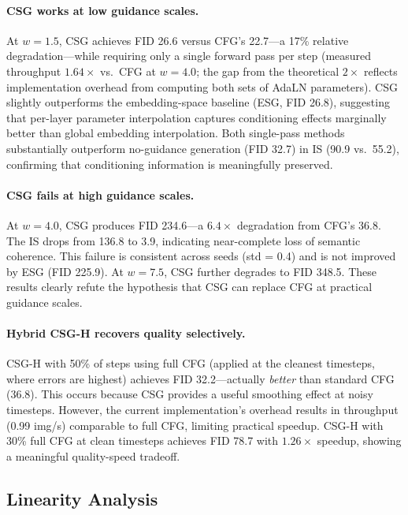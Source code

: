 \documentclass{article}
\newcommand{\adaln}{AdaLN}
\begin{document}
\paragraph{CSG works at low guidance scales.}
At $w = 1.5$, CSG achieves FID 26.6 versus CFG's 22.7---a 17\% relative degradation---while requiring only a single forward pass per step (measured throughput $1.64\times$ vs.\ CFG at $w{=}4.0$; the gap from the theoretical $2\times$ reflects implementation overhead from computing both sets of \adaln{} parameters). CSG slightly outperforms the embedding-space baseline (ESG, FID 26.8), suggesting that per-layer parameter interpolation captures conditioning effects marginally better than global embedding interpolation. Both single-pass methods substantially outperform no-guidance generation (FID 32.7) in IS (90.9 vs.\ 55.2), confirming that conditioning information is meaningfully preserved.

\paragraph{CSG fails at high guidance scales.}
At $w = 4.0$, CSG produces FID 234.6---a $6.4\times$ degradation from CFG's 36.8. The IS drops from 136.8 to 3.9, indicating near-complete loss of semantic coherence. This failure is consistent across seeds (std = 0.4) and is not improved by ESG (FID 225.9). At $w = 7.5$, CSG further degrades to FID 348.5. These results clearly refute the hypothesis that CSG can replace CFG at practical guidance scales.

\paragraph{Hybrid CSG-H recovers quality selectively.}
CSG-H with 50\% of steps using full CFG (applied at the cleanest timesteps, where errors are highest) achieves FID 32.2---actually \textit{better} than standard CFG (36.8). This occurs because CSG provides a useful smoothing effect at noisy timesteps. However, the current implementation's overhead results in throughput (0.99 img/s) comparable to full CFG, limiting practical speedup. CSG-H with 30\% full CFG at clean timesteps achieves FID 78.7 with $1.26\times$ speedup, showing a meaningful quality-speed tradeoff.

\subsection{Linearity Analysis}
\label{sec:linearity}
\end{document}
